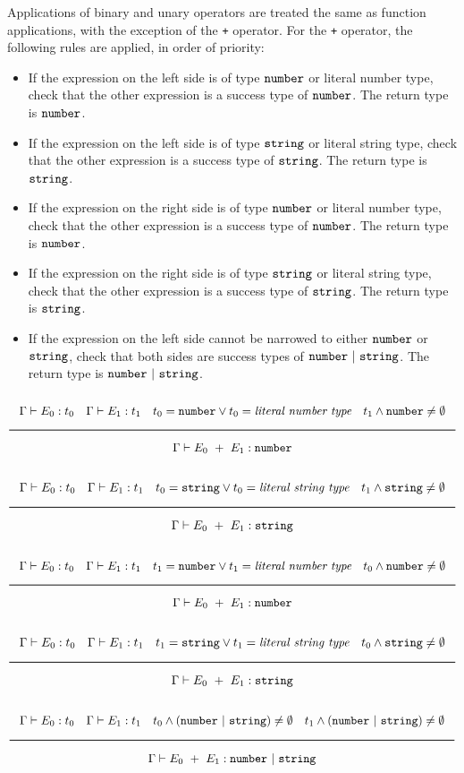 Applications of binary and unary operators are treated the same as function applications, with the exception of the \texttt{+} operator.
For the \texttt{+} operator, the following rules are applied, in order of priority:

\begin{itemize}
\item{If the expression on the left side is of type $\texttt{number}$ or literal number type,
  check that the other expression is a success type of $\texttt{number}$. The return type is $\texttt{number}$.}
\item{If the expression on the left side is of type $\texttt{string}$ or literal string type,
  check that the other expression is a success type of $\texttt{string}$. The return type is $\texttt{string}$.}
\item{If the expression on the right side is of type $\texttt{number}$ or literal number type,
  check that the other expression is a success type of $\texttt{number}$. The return type is $\texttt{number}$.}
\item{If the expression on the right side is of type $\texttt{string}$ or literal string type,
  check that the other expression is a success type of $\texttt{string}$. The return type is $\texttt{string}$.}
\item{If the expression on the left side cannot be narrowed to either $\texttt{number}$ or $\texttt{string}$, check that both sides are success types of 
  $\Number\ |\ \String$. The return type is $\Number\ |\ \String$.}
\end{itemize}

\noindent
\[
  \Rule{\Gamma \vdash E_0 : t_0 \quad \Gamma \vdash E_1 : t_1 \quad t_0 = \Number \vee t_0 = \textit{literal number type}
    \quad t_1 \wedge \Number \neq \emptyset}{\Gamma \vdash E_0\ + \ E_1 : \Number}
\]
\noindent
\[
  \Rule{\Gamma \vdash E_0 : t_0 \quad \Gamma \vdash E_1 : t_1 \quad t_0 = \String \vee t_0 = \textit{literal string type}
    \quad t_1 \wedge \String \neq \emptyset}{\Gamma \vdash E_0\ + \ E_1 : \String}
\]
\noindent
\[
  \Rule{\Gamma \vdash E_0 : t_0 \quad \Gamma \vdash E_1 : t_1 \quad t_1 = \Number \vee t_1 = \textit{literal number type}
    \quad t_0 \wedge \Number \neq \emptyset}{\Gamma \vdash E_0\ + \ E_1 : \Number}
\]
\noindent
\[
  \Rule{\Gamma \vdash E_0 : t_0 \quad \Gamma \vdash E_1 : t_1 \quad t_1 = \String \vee t_1 = \textit{literal string type}
    \quad t_0 \wedge \String \neq \emptyset}{\Gamma \vdash E_0\ + \ E_1 : \String}
\]
\noindent
\[
  \Rule{\Gamma \vdash E_0 : t_0 \quad \Gamma \vdash E_1 : t_1 \quad t_0 \wedge (\Number\ |\ \String) \neq \emptyset
    \quad t_1 \wedge (\Number\ |\ \String) \neq \emptyset}{\Gamma \vdash E_0\ + \ E_1 : \Number\ |\ \String}
\]
\noindent

